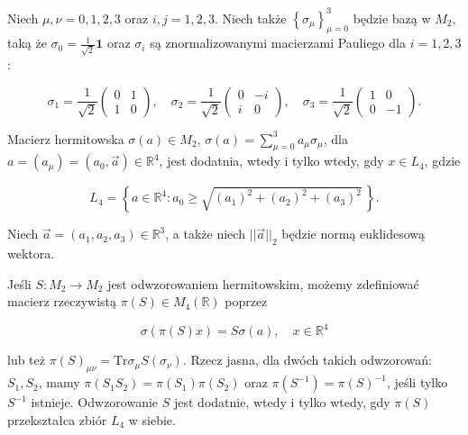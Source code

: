 Niech $\mu,\nu = 0,1,2,3$ oraz $i,j = 1,2,3$.
Niech także $\left\{ \sigma_{\mu} \right\}_{\mu=0}^{3}$
będzie bazą w  $M_{2}$, taką że
$\sigma_{0} = \tfrac{1}{\sqrt{2}}  \mathbf{1}$ oraz
$\sigma_{i}$
są znormalizowanymi macierzami Pauliego dla $i=1,2,3$:
\begin{linenomath*}
 \begin{equation}
 \sigma_{1} = \frac{1}{\sqrt{2}} \begin{pmatrix}
        0 & 1 \\ 1 & 0
           \end{pmatrix},
\quad
\sigma_{2} = \frac{1}{\sqrt{2}}  \begin{pmatrix}
        0 & -i \\ i & 0
           \end{pmatrix},
\quad
\sigma_{3} = \frac{1}{\sqrt{2}}  \begin{pmatrix}
        1 & 0 \\ 0 & -1
           \end{pmatrix}.
 \end{equation}
\end{linenomath*}
Macierz hermitowska $\sigma(a) \in M_{2}$,
$\sigma(a) = \sum_{\mu =0}^{3} a_{\mu} \sigma_{\mu}$,
dla $a = (a_{\mu}) = (a_{0}, \vec{a}) \in \mathbb{R}^{4}$,
jest dodatnia, wtedy i tylko wtedy, gdy
$x \in L_{4}$,
gdzie
\begin{linenomath*}
 \begin{equation}
L_{4} = \left \{
            a \in \mathbb{R}^{4} :
            a_{0} \geq \sqrt{(a_{1})^{2} + (a_{2})^{2} + (a_{3})^{2}} \,
        \right \}.
 \end{equation}
\end{linenomath*}
Niech $\vec{a} = (a_{1}, a_{2}, a_{3}) \in \mathbb{R}^{3}$,
a także niech $||\vec{a}||_{2}$ będzie normą euklidesową wektora.

Jeśli $S: M_{2} \rightarrow M_{2}$ jest odwzorowaniem hermitowskim,
możemy zdefiniować macierz rzeczywistą $\pi(S) \in M_{4}(\mathbb{R})$ poprzez
\begin{linenomath*}
 \begin{equation}
\label{def:PiofSiso}
  \sigma(\pi(S) x) = S \sigma(a), \quad x \in \mathbb{R}^{4}
 \end{equation}
\end{linenomath*}
lub też $\pi(S)_{\mu \nu} = \text{Tr} \sigma_{\mu} S(\sigma_{\nu})$.
Rzecz jasna, dla dwóch takich odwzorowań: $S_{1}, S_{2}$, mamy
$\pi(S_{1} S_{2}) = \pi(S_{1}) \pi(S_{2})$
oraz $\pi(S^{-1}) = \pi(S)^{-1}$, jeśli tylko $S^{-1}$ istnieje.
Odwzorowanie $S$ jest dodatnie, wtedy i tylko wtedy, gdy
$\pi(S)$ przekształca zbiór $L_{4}$ w siebie.

